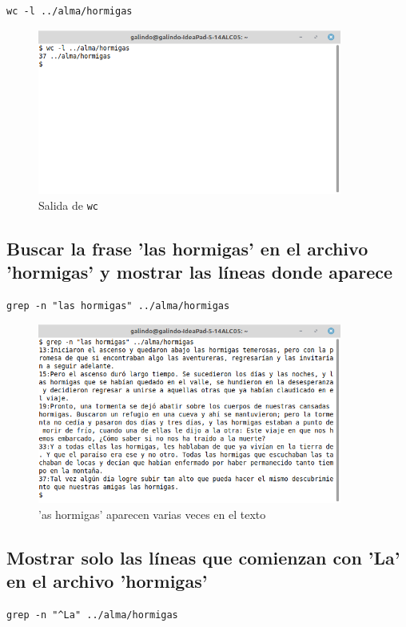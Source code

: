 \documentclass[11pt]{article}
\begin{document}
\begin{verbatim}
wc -l ../alma/hormigas
\end{verbatim}

\begin{figure}[htbp]
\centering
\includegraphics[width=10cm]{img/a17.png}
\caption[\texttt{wc}]{Salida de \texttt{wc}}
\end{figure}

\pagebreak

\subsection{Buscar la frase 'las hormigas' en el archivo 'hormigas' y mostrar las líneas donde aparece}
\label{sec:org6a32e06}
\begin{verbatim}
grep -n "las hormigas" ../alma/hormigas
\end{verbatim}

\begin{figure}[htbp]
\centering
\includegraphics[width=10cm]{img/a18.png}
\caption{'as hormigas' aparecen varias veces en el texto}
\end{figure}

\subsection{Mostrar solo las líneas que comienzan con 'La' en el archivo 'hormigas'}
\label{sec:org3147b7b}
\begin{verbatim}
grep -n "^La" ../alma/hormigas
\end{verbatim}
\end{document}
